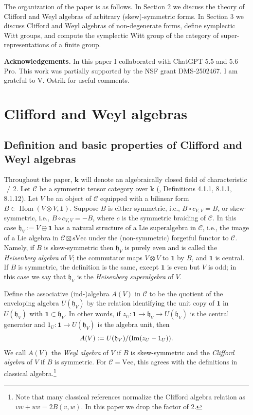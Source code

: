 \documentclass[12pt]{amsart}
\numberwithin{equation}{section}
\providecommand{\k}{}\renewcommand{\k}{\mathbf{k}}
\providecommand{\C}{}\renewcommand{\C}{\mathcal{C}}
\providecommand{\Vec}{}\renewcommand{\Vec}{\mathrm{Vec}}
\providecommand{\sVec}{}\renewcommand{\sVec}{\mathrm{sVec}}
\providecommand{\h}{}\renewcommand{\h}{\mathfrak{h}}
\providecommand{\Hom}{}\renewcommand{\Hom}{\operatorname{Hom}}
\theoremstyle{plain}
\theoremstyle{definition}
\theoremstyle{remark}
\begin{document}
The organization of the paper is as follows. In Section 2 we discuss the theory of Clifford and Weyl algebras of arbitrary (skew)-symmetric forms. In Section 3 we discuss Clifford and Weyl algebras of non-degenerate forms, define symplectic Witt groups, and compute the symplectic Witt group 
of the category of super-representations of a finite group. 

{\bf Acknowledgements.} In this paper I collaborated with ChatGPT 5.5 and 5.6 Pro. This work was partially supported by the NSF grant DMS-2502467. I am grateful to V. Ostrik for useful comments. 



\section{Clifford and Weyl algebras} 

\subsection{Definition and basic properties of Clifford and Weyl algebras} 
Throughout the paper, $\k$ will denote an algebraically closed field of characteristic $\ne 2$. Let $\C$ be a symmetric tensor category over $\k$ (\cite{EGNO}, Definitions 4.1.1, 8.1.1, 8.1.12).   
Let $V$ be an object of $\C$ equipped with a bilinear form $B\in \Hom(V\otimes V,\mathbf{1})$. Suppose $B$ is either symmetric, i.e., $B\circ c_{V,V}=B$, or skew-symmetric, i.e., $B\circ c_{V,V}=-B$, where $c$ is the symmetric braiding of $\C$. In this case $\h_V:=V\oplus \mathbf{1}$ has a natural structure of a Lie superalgebra in $\C$, i.e., 
the image of a Lie algebra in $\C\boxtimes \sVec$ under the (non-symmetric) forgetful functor to $\C$. Namely,
if $B$ is skew-symmetric then $\h_V$ is purely even and is called the {\it Heisenberg algebra} of $V$; 
the commutator maps $V\otimes V$ to $\mathbf{1}$ by $B$, and $\mathbf{1}$ is central. If $B$ is symmetric, 
the definition is the same, except $\mathbf{1}$ is even but $V$ is odd; in this case we say that 
$\h_V$ is the {\it Heisenberg superalgebra} of $V$. 

Define the associative (ind-)algebra $A(V)$ in $\C$ 
to be the quotient of the enveloping algebra $U(\h_V)$ by the relation identifying the unit 
copy of $\mathbf{1}$ in $U(\h_V)$ with $\mathbf{1}\subset \h_V$. In other words, if $z_U:\mathbf 1\to\mathfrak h_V\to U(\mathfrak h_V)$ is the central generator and $1_U:\mathbf 1\to U(\mathfrak h_V)$ is the algebra unit, then 
$$
A(V):=U(\mathfrak h_V)/({\rm Im}(z_U-1_U)).
$$
We call 
$A(V)$ the {\it Weyl algebra} of $V$ if $B$ is skew-symmetric and 
the {\it Clifford algebra} of $V$ if $B$ is symmetric. 
For $\C=\Vec$, this agrees with the definitions 
in classical algebra.\footnote{Note that many classical references normalize the Clifford algebra relation as $vw+wv=2B(v,w)$. In this paper we drop the factor of $2$.} 
\end{document}

